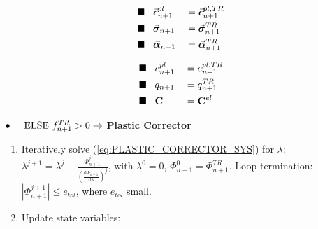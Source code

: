 {\begin{tcolorbox}
		\vspace{-1.2cm}
		\hspace{-1.03cm}\begin{minipage}[t]{0.6\linewidth}
			\begin{alignat*}{2}
				\blacksquare\hspace{0.3cm}	&\vec{\bm{\epsilon}}^{pl}_{n+1} &&=
				\vec{\bm{\epsilon}}^{pl,TR}_{n+1}\\
				\blacksquare\hspace{0.3cm}	&\vec{\bm{\sigma}}_{n+1}
				&&=\vec{\bm{\sigma}}^{TR}_{n+1}\\
				\blacksquare\hspace{0.3cm}	&\vec{\bm{\alpha}}_{n+1} &&= 
				\vec{\bm{\alpha}}^{TR}_{n+1}
			\end{alignat*}
		\end{minipage}
		\begin{minipage}[t]{0.41\linewidth}
			\begin{alignat*}{2}
				\blacksquare\hspace{0.3cm} &e^{pl}_{n+1} &&= e^{pl,TR}_{n+1}\\
				\blacksquare\hspace{0.3cm}	&q_{n+1} &&= q^{TR}_{n+1}\\
				\blacksquare\hspace{0.3cm}	&\mathbf{C} &&= \mathbf{C}^{el}
			\end{alignat*}
		\end{minipage}
		
		\vspace{0.6cm}
		$\bullet\hspace{0.5cm}\text{ELSE}\ f_{n+1}^{TR}>0\rightarrow$  
		\textbf{Plastic Corrector}
		\begin{enumerate}
			\item Iteratively solve (\ref{eq:PLASTIC_CORRECTOR_SYS}) for 
			$\lambda$:
			$\lambda^{j+1}=\lambda^j-\frac{\Phi_{n+1}^j}{(\frac{\text{d}\Phi_{n+1}}{\text{d}\lambda})^j}$,
			with $\lambda^0 = 0$, $\Phi_{n+1}^0 = \Phi_{n+1}^{TR}$. Loop 
			termination:
			$|\Phi_{n+1}^{j+1}|\leq e_{tol}$, where $e_{tol}$ small.
			\item Update state variables:
			

\end{enumerate}
\end{tcolorbox}}
